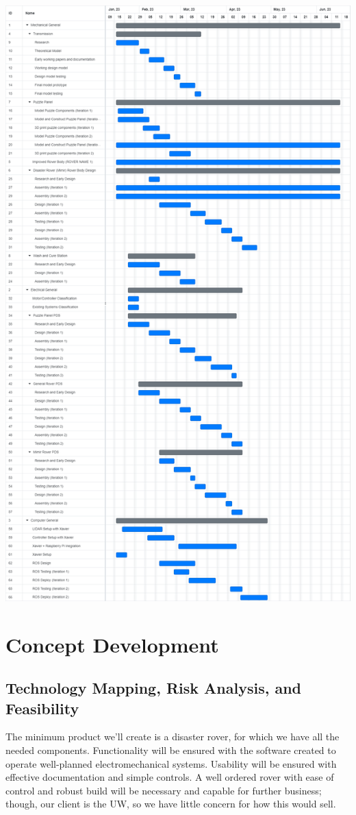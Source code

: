\documentclass[a4paper, 10pt]{article}
\begin{document}
	\includegraphics[scale=0.3]{Photos/Gantt Chart}

\pagebreak	

\section{Concept Development}
	\subsection{Technology Mapping, Risk Analysis, and Feasibility}
	The minimum product we'll create is a disaster rover, for which we have all the needed components. Functionality will be ensured with the software created to operate well-planned electromechanical systems. Usability will be ensured with effective documentation and simple controls. A well ordered rover with ease of control and robust build will be necessary and capable for further business; though, our client is the UW, so we have little concern for how this would  sell.
	
\end{document}
